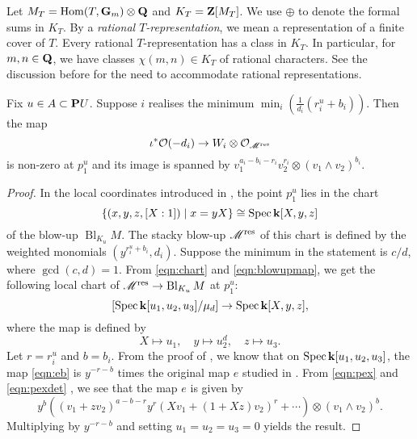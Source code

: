 \documentclass{amsart}
\renewcommand{\k}{\mathbf k}
\DeclareMathOperator{\Bl}{Bl}
\renewcommand{\O}{\mathcal O}
\begin{document}
Let \(M_T = \Hom(T, \Gm) \otimes \Q\) and \(K_T = \Z[M_T]\).
We use \(\oplus\) to denote the formal sums in \(K_T\).
By a \emph{rational \(T\)-representation}, we mean a representation of a finite cover of \(T\).
Every rational \(T\)-representation has a class in \(K_T\).
In particular, for \(m, n \in \Q\), we have classes \(\chi(m,n) \in K_T\) of rational characters.
See the discussion before \cite[Proposition~5.3.4]{kre:99} for the need to accommodate rational representations.


\begin{proposition}
  \label{prop:p1uO1}
  Fix \(u \in A  \subset \P U\).
  Suppose \(i\) realises the minimum \(\min_i(\frac{1}{d_i}(r_i^u+b_i))\).
  Then the map
  \begin{equation}\label{eqn:eb}
    \iota^{*} \O(-d_i) \to W_i \otimes \O_{\mathscr M^{\rm res}}
  \end{equation}    
  is non-zero at \(p_1^u\) and its image is spanned by
  \( v_1^{a_i-b_i-r_i}v_2^{r_i} \otimes (v_1 \wedge v_2)^{b_i}\).
\end{proposition}
\begin{proof}
  In the local coordinates introduced in , the point \(p_1^u\) lies in the chart
  \[\{(x,y,z,[X:1]) \mid x = yX\} \cong \spec \k[X,y,z]\]
  of the blow-up \(\Bl_{K_u}M\).
  The stacky blow-up \(\mathscr M^{\rm res}\) of this chart is defined by the weighted monomials \((y^{r_i^u+b_i},d_i)\).
  Suppose the minimum in the statement is \(c/d\), where \(\gcd(c,d) = 1\).
  From \eqref{eqn:chart} and \eqref{eqn:blowupmap}, we get the following local chart of \(\mathscr M^{\rm res} \to \Bl_{K_u}M\) at \(p_1^u\):
  \[ [\spec \k[u_1,u_2,u_3] / \mu_d] \to \spec \k[X,y,z],\]
  where the map is defined by
  \[ X \mapsto u_1, \quad y \mapsto u^{d}_2, \quad z \mapsto u_3.\]
  Let \(r = r_i^u\) and \(b = b_i\).
  From the proof of , we know that on \(\spec \k[u_1,u_2,u_3]\), the map \eqref{eqn:eb} is \(y^{-r-b}\) times the original map \(e\) studied in .
  From \eqref{eqn:pex} and \eqref{eqn:pexdet} , we see that the map \(e\) is given by
  \[ y^{b}\left((v_1+zv_2)^{a-b-r}y^{r}(Xv_{1}+(1+Xz)v_{2})^{r}   + \cdots \right) \otimes (v_1 \wedge v_2)^b.\]
  Multiplying by \(y^{-r-b}\) and setting \(u_1 = u_2 = u_3 = 0\) yields the result.    
\end{proof}
\end{document}
